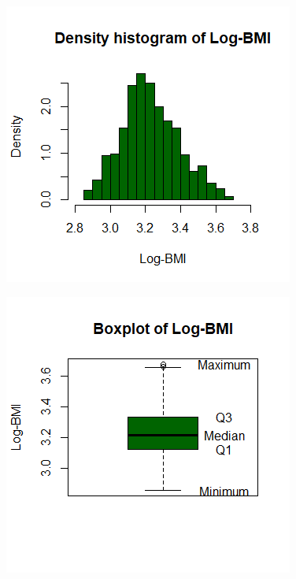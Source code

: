 \begin{figure}[ht!]
\centering
\begin{minipage}{.5\textwidth}
  \centering
  \includegraphics[width=1\linewidth]{root/Hist_log.png}
  \label{HistLog}
\end{minipage}%
\begin{minipage}{.5\textwidth}
  \centering
  \includegraphics[width=1\linewidth]{root/Box_log.png}
  \label{BoxLog}
\end{minipage}
\end{figure}
